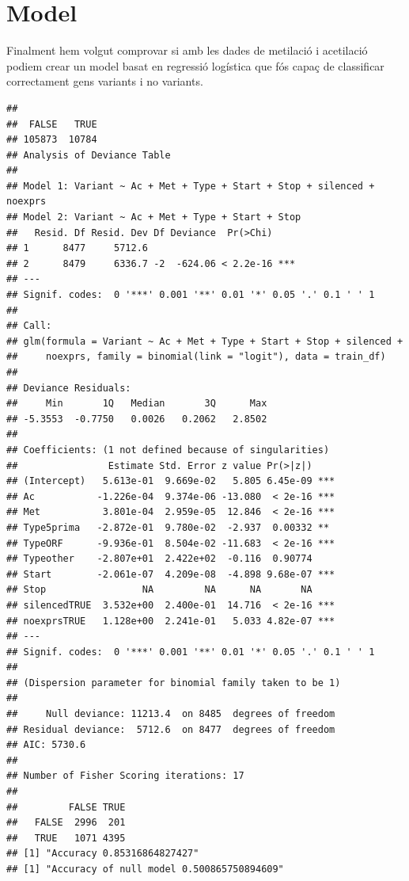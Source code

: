 \documentclass{article}\usepackage[]{graphicx}\usepackage[]{color}
\makeatletter
\newenvironment{kframe}{%
 \def\at@end@of@kframe{}%
 \ifinner\ifhmode%
  \def\at@end@of@kframe{\end{minipage}}%
  \begin{minipage}{\columnwidth}%
 \fi\fi%
 \def\FrameCommand##1{\hskip\@totalleftmargin \hskip-\fboxsep
 \colorbox{shadecolor}{##1}\hskip-\fboxsep
     \hskip-\linewidth \hskip-\@totalleftmargin \hskip\columnwidth}%
 \MakeFramed {\advance\hsize-\width
   \@totalleftmargin\z@ \linewidth\hsize
   \@setminipage}}%
 {\par\unskip\endMakeFramed%
 \at@end@of@kframe}
\newenvironment{knitrout}{}{} %
\makeatother
\begin{document}
\section{Model}
Finalment hem volgut comprovar si amb les dades de metilació i acetilació podiem crear un model basat en regressió logística que fós capaç de classificar correctament gens variants i no variants.
\begin{knitrout}
\color{fgcolor}\begin{kframe}
\begin{verbatim}
## 
##  FALSE   TRUE 
## 105873  10784
## Analysis of Deviance Table
## 
## Model 1: Variant ~ Ac + Met + Type + Start + Stop + silenced + noexprs
## Model 2: Variant ~ Ac + Met + Type + Start + Stop
##   Resid. Df Resid. Dev Df Deviance  Pr(>Chi)    
## 1      8477     5712.6                          
## 2      8479     6336.7 -2  -624.06 < 2.2e-16 ***
## ---
## Signif. codes:  0 '***' 0.001 '**' 0.01 '*' 0.05 '.' 0.1 ' ' 1
## 
## Call:
## glm(formula = Variant ~ Ac + Met + Type + Start + Stop + silenced + 
##     noexprs, family = binomial(link = "logit"), data = train_df)
## 
## Deviance Residuals: 
##     Min       1Q   Median       3Q      Max  
## -5.3553  -0.7750   0.0026   0.2062   2.8502  
## 
## Coefficients: (1 not defined because of singularities)
##                Estimate Std. Error z value Pr(>|z|)    
## (Intercept)   5.613e-01  9.669e-02   5.805 6.45e-09 ***
## Ac           -1.226e-04  9.374e-06 -13.080  < 2e-16 ***
## Met           3.801e-04  2.959e-05  12.846  < 2e-16 ***
## Type5prima   -2.872e-01  9.780e-02  -2.937  0.00332 ** 
## TypeORF      -9.936e-01  8.504e-02 -11.683  < 2e-16 ***
## Typeother    -2.807e+01  2.422e+02  -0.116  0.90774    
## Start        -2.061e-07  4.209e-08  -4.898 9.68e-07 ***
## Stop                 NA         NA      NA       NA    
## silencedTRUE  3.532e+00  2.400e-01  14.716  < 2e-16 ***
## noexprsTRUE   1.128e+00  2.241e-01   5.033 4.82e-07 ***
## ---
## Signif. codes:  0 '***' 0.001 '**' 0.01 '*' 0.05 '.' 0.1 ' ' 1
## 
## (Dispersion parameter for binomial family taken to be 1)
## 
##     Null deviance: 11213.4  on 8485  degrees of freedom
## Residual deviance:  5712.6  on 8477  degrees of freedom
## AIC: 5730.6
## 
## Number of Fisher Scoring iterations: 17
##        
##         FALSE TRUE
##   FALSE  2996  201
##   TRUE   1071 4395
## [1] "Accuracy 0.85316864827427"
## [1] "Accuracy of null model 0.500865750894609"
\end{verbatim}



\end{kframe}
\end{knitrout}
\end{document}
